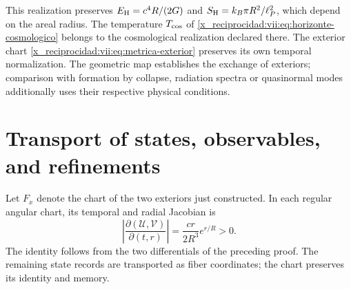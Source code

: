 This realization preserves
\(E_{\rm H}=c^4R/(2G)\) and
\(S_{\rm H}=k_B\pi R^2/\ell_P^2\), which depend on the areal radius.
The temperature \(T_{\rm cos}\) of
\eqref{x_reciprocidad:vii:eq:horizonte-cosmologico} belongs to the cosmological
realization declared there. The exterior chart
\eqref{x_reciprocidad:vii:eq:metrica-exterior} preserves its own temporal normalization.
The geometric map establishes the exchange of exteriors; comparison
with formation by collapse, radiation spectra or quasinormal modes
additionally uses their respective physical conditions.

\section{Transport of states, observables, and refinements}
\label{x_reciprocidad:vii:subsec:transporte-informacion-horizonte}

Let \(F_x\) denote the chart of the two exteriors just constructed.
In each regular angular chart, its temporal and radial Jacobian is
\begin{equation}
 \left|\frac{\partial(\mathcal U,\mathcal V)}{\partial(t,r)}\right|
 =\frac{cr}{2R^3}e^{r/R}>0.
 \label{x_reciprocidad:vii:eq:jacobiano-kruskal}
\end{equation}
The identity follows from the two differentials of the preceding proof.
The remaining state records are transported as fiber
coordinates; the chart preserves its identity and memory.


